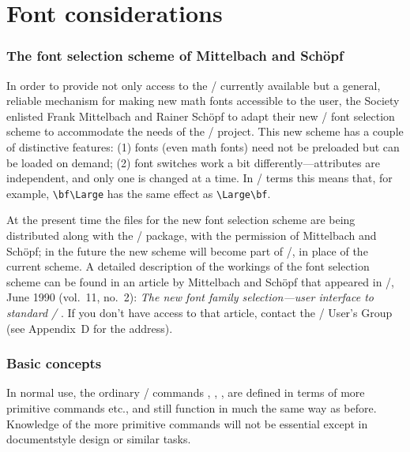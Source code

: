 \newpage
\part{Font considerations}
\label{s:fonts}

\section{The font selection scheme of Mittelbach and Sch\"opf}

In order to provide not only access to the \amsfonts/ currently
available but a general, reliable mechanism for making new math fonts
accessible to the user, the Society enlisted Frank Mittelbach and
Rainer Sch\"opf to adapt their new \latex/ font selection scheme
to accommodate the needs of the \amslatex/ project.  This new scheme has
a couple of distinctive features: (1) fonts (even math fonts) need not
be preloaded but can be loaded on demand; (2) font switches work a bit
differently---attributes are independent, and only one is changed at a
time.  In \latex/ terms this means that, for example, \verb"\bf\Large"
has the same effect as \verb"\Large\bf".

At the present time the files for the new font selection scheme are
being distributed along with the \amslatex/ package, with the
permission of Mittelbach and Sch\"opf; in the future the new scheme
will become part of \latex/, in place of the current scheme.  A
detailed description of the workings of the font selection scheme can
be found in an article by Mittelbach and Sch\"opf that appeared in
\tugboat/, June 1990 (vol.~11, no.~2): {\it The new font family
selection---user interface to standard \latex/\/}
\cite{msf}.  If you don't have access to that article, contact the
\tex/ User's Group (see Appendix~D for the address).

\section{Basic concepts}

In normal use, the ordinary \latex/ commands ,
, ,  are defined in terms of more primitive
commands  etc., and  still function in much the same way as
before.  Knowledge of the more primitive commands will not be
essential except in documentstyle design or similar tasks.

